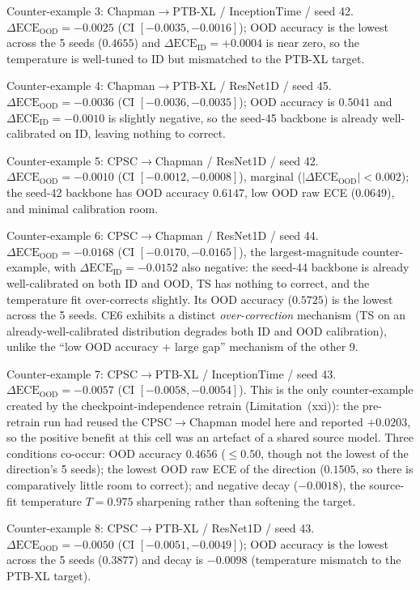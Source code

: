 \documentclass[review,12pt,nonatbib]{elsarticle}
\begin{document}
Counter-example 3: Chapman$\rightarrow$PTB-XL / InceptionTime / seed 42.
$\Delta\text{ECE}_{\text{OOD}}=-0.0025$ (CI $[-0.0035, -0.0016]$); OOD
accuracy is the lowest across the 5 seeds ($0.4655$) and
$\Delta\text{ECE}_{\text{ID}}=+0.0004$ is near zero, so the temperature is
well-tuned to ID but mismatched to the PTB-XL target.

Counter-example 4: Chapman$\rightarrow$PTB-XL / ResNet1D / seed 45.
$\Delta\text{ECE}_{\text{OOD}}=-0.0036$ (CI $[-0.0036, -0.0035]$); OOD
accuracy is $0.5041$ and $\Delta\text{ECE}_{\text{ID}}=-0.0010$ is slightly
negative, so the seed-45 backbone is already well-calibrated on ID,
leaving nothing to correct.

Counter-example 5: CPSC$\rightarrow$Chapman / ResNet1D / seed 42.
$\Delta\text{ECE}_{\text{OOD}}=-0.0010$ (CI $[-0.0012, -0.0008]$), marginal
($|\Delta\text{ECE}_{\text{OOD}}|<0.002$); the seed-42 backbone has OOD
accuracy $0.6147$, low OOD raw ECE ($0.0649$), and minimal calibration
room.

Counter-example 6: CPSC$\rightarrow$Chapman / ResNet1D / seed 44.
$\Delta\text{ECE}_{\text{OOD}}=-0.0168$ (CI $[-0.0170, -0.0165]$), the
largest-magnitude counter-example, with
$\Delta\text{ECE}_{\text{ID}}=-0.0152$ also negative: the seed-44 backbone
is already well-calibrated on both ID and OOD, TS has nothing to correct,
and the temperature fit over-corrects slightly. Its OOD
accuracy ($0.5725$) is the lowest across the 5 seeds. CE6 exhibits a
distinct \emph{over-correction} mechanism (TS on an already-well-calibrated
distribution degrades both ID and OOD calibration), unlike the ``low OOD
accuracy + large gap'' mechanism of the other 9.

Counter-example 7: CPSC$\rightarrow$PTB-XL / InceptionTime / seed 43.
$\Delta\text{ECE}_{\text{OOD}}=-0.0057$ (CI $[-0.0058, -0.0054]$). This
is the only counter-example created by the checkpoint-independence
retrain (Limitation~(xxi)): the pre-retrain run had reused the
CPSC$\rightarrow$Chapman model here and reported $+0.0203$, so the
positive benefit at this cell was an artefact of a shared source model.
Three conditions co-occur: OOD accuracy $0.4656$ ($\leq 0.50$, though
not the lowest of the direction's 5 seeds); the lowest OOD raw ECE of
the direction ($0.1505$, so there is comparatively little room to
correct); and negative decay ($-0.0018$), the source-fit temperature
$T=0.975$ sharpening rather than softening the target.

Counter-example 8: CPSC$\rightarrow$PTB-XL / ResNet1D / seed 43.
$\Delta\text{ECE}_{\text{OOD}}=-0.0050$ (CI $[-0.0051, -0.0049]$); OOD
accuracy is the lowest across the 5 seeds ($0.3877$) and decay is
$-0.0098$ (temperature mismatch to the PTB-XL target).
\end{document}
